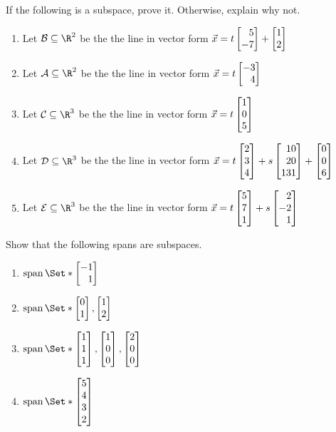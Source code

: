 \begin{exercises}
\begin{problist}
		\prob If the following is a subspace, prove it. Otherwise, explain why not.
		\begin{enumerate}
			\item Let $\mathcal B \subseteq \R^2$ be the the line in vector form
			$\vec x = t\mat{5\\-7}+\mat{1\\2}$
			\item Let $\mathcal A \subseteq \R^2$ be the the line in vector form
			$\vec x = t\mat{-3\\4}$
			\item Let $\mathcal C \subseteq \R^3$ be the the line in vector form
			$\vec x = t\mat{1\\0\\5}$
			\item Let $\mathcal D \subseteq \R^3$ be the the line in vector form
			$\vec x = t\mat{2\\3\\4}+s\mat{10\\20\\131}+\mat{0\\0\\6}$
			\item Let $\mathcal E \subseteq \R^3$ be the the line in vector form
			$\vec x = t\mat{5\\7\\1}+s\mat{2\\-2\\1}$
		\end{enumerate}

		\prob Show that the following spans are subspaces.
		\begin{enumerate}
			\item $\Span\Set*{\mat{-1\\1}}$
			\item $\Span\Set*{\mat{0\\1}, \mat{1\\2}}$
			\item $\Span\Set*{\mat{1\\1\\1}, \mat{1\\0\\0}, \mat{2\\0\\0}}$
			\item $\Span\Set*{\mat{5\\4\\3\\2}}$
		\end{enumerate}


\end{problist}
\end{exercises}
